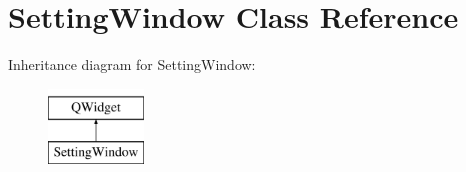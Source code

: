 \hypertarget{class_setting_window}{}\section{Setting\+Window Class Reference}
\label{class_setting_window}
Inheritance diagram for Setting\+Window\+:\begin{figure}[H]
\begin{center}
\leavevmode
\includegraphics[height=2.000000cm]{class_setting_window}
\end{center}
\end{figure}
